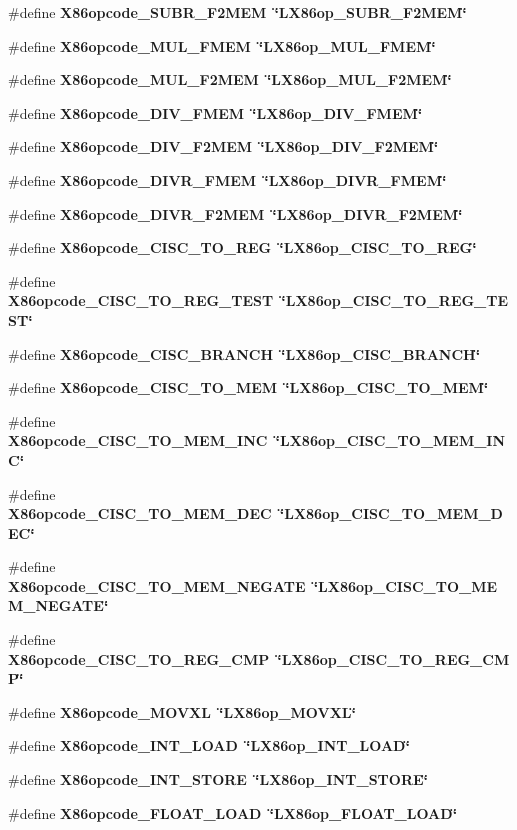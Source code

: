 \begin{CompactItemize}
\#define \bf{X86opcode\_\-SUBR\_\-F2MEM}~\char`\"{}LX86op\_\-SUBR\_\-F2MEM\char`\"{}
\item 
\#define \bf{X86opcode\_\-MUL\_\-FMEM}~\char`\"{}LX86op\_\-MUL\_\-FMEM\char`\"{}
\item 
\#define \bf{X86opcode\_\-MUL\_\-F2MEM}~\char`\"{}LX86op\_\-MUL\_\-F2MEM\char`\"{}
\item 
\#define \bf{X86opcode\_\-DIV\_\-FMEM}~\char`\"{}LX86op\_\-DIV\_\-FMEM\char`\"{}
\item 
\#define \bf{X86opcode\_\-DIV\_\-F2MEM}~\char`\"{}LX86op\_\-DIV\_\-F2MEM\char`\"{}
\item 
\#define \bf{X86opcode\_\-DIVR\_\-FMEM}~\char`\"{}LX86op\_\-DIVR\_\-FMEM\char`\"{}
\item 
\#define \bf{X86opcode\_\-DIVR\_\-F2MEM}~\char`\"{}LX86op\_\-DIVR\_\-F2MEM\char`\"{}
\item 
\#define \bf{X86opcode\_\-CISC\_\-TO\_\-REG}~\char`\"{}LX86op\_\-CISC\_\-TO\_\-REG\char`\"{}
\item 
\#define \bf{X86opcode\_\-CISC\_\-TO\_\-REG\_\-TEST}~\char`\"{}LX86op\_\-CISC\_\-TO\_\-REG\_\-TEST\char`\"{}
\item 
\#define \bf{X86opcode\_\-CISC\_\-BRANCH}~\char`\"{}LX86op\_\-CISC\_\-BRANCH\char`\"{}
\item 
\#define \bf{X86opcode\_\-CISC\_\-TO\_\-MEM}~\char`\"{}LX86op\_\-CISC\_\-TO\_\-MEM\char`\"{}
\item 
\#define \bf{X86opcode\_\-CISC\_\-TO\_\-MEM\_\-INC}~\char`\"{}LX86op\_\-CISC\_\-TO\_\-MEM\_\-INC\char`\"{}
\item 
\#define \bf{X86opcode\_\-CISC\_\-TO\_\-MEM\_\-DEC}~\char`\"{}LX86op\_\-CISC\_\-TO\_\-MEM\_\-DEC\char`\"{}
\item 
\#define \bf{X86opcode\_\-CISC\_\-TO\_\-MEM\_\-NEGATE}~\char`\"{}LX86op\_\-CISC\_\-TO\_\-MEM\_\-NEGATE\char`\"{}
\item 
\#define \bf{X86opcode\_\-CISC\_\-TO\_\-REG\_\-CMP}~\char`\"{}LX86op\_\-CISC\_\-TO\_\-REG\_\-CMP\char`\"{}
\item 
\#define \bf{X86opcode\_\-MOVXL}~\char`\"{}LX86op\_\-MOVXL\char`\"{}
\item 
\#define \bf{X86opcode\_\-INT\_\-LOAD}~\char`\"{}LX86op\_\-INT\_\-LOAD\char`\"{}
\item 
\#define \bf{X86opcode\_\-INT\_\-STORE}~\char`\"{}LX86op\_\-INT\_\-STORE\char`\"{}
\item 
\#define \bf{X86opcode\_\-FLOAT\_\-LOAD}~\char`\"{}LX86op\_\-FLOAT\_\-LOAD\char`\"{}
\item 

\end{CompactItemize}
